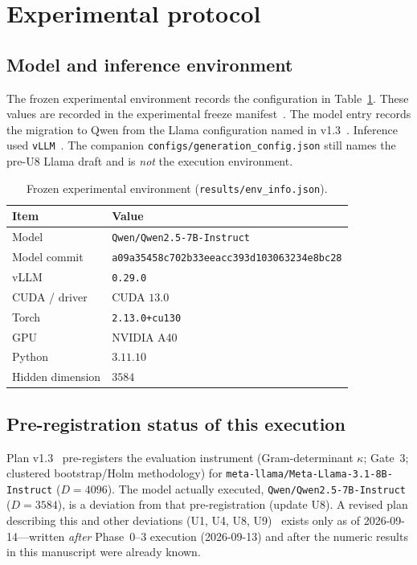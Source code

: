 \documentclass{article}
\begin{document}
\section{Experimental protocol}
\label{sec:protocol}

\subsection{Model and inference environment}
\label{sec:env}

The frozen experimental environment records the configuration in Table~\ref{tab:env}. These values are recorded in the experimental freeze manifest~\citep{exptrj001freeze}. The model entry records the migration to {Qwen} from the {Llama} configuration named in v1.3~\citep{exptrj001planv13}. Inference used \texttt{vLLM}~\citep{kwon2023vllm}. The companion \texttt{configs/generation\_config.json} still names the pre-U8 {Llama} draft and is \emph{not} the execution environment.

\begin{table}[t]
\centering
\caption{Frozen experimental environment (\texttt{results/env\_info.json}).}
\label{tab:env}
\small
\begin{tabular}{@{}ll@{}}
\toprule
Item & Value \\
\midrule
Model & \texttt{Qwen/Qwen2.5-7B-Instruct} \\
Model commit & \texttt{a09a35458c702b33eeacc393d103063234e8bc28} \\
vLLM & \texttt{0.29.0} \\
{CUDA} / driver & {CUDA} $13.0$ \\
Torch & \texttt{2.13.0+cu130} \\
{GPU} & {NVIDIA A40} \\
Python & $3.11.10$ \\
Hidden dimension & $3584$ \\
\bottomrule
\end{tabular}
\end{table}

\subsection{Pre-registration status of this execution}
\label{sec:prereg-status}

Plan v1.3~\citep{exptrj001planv13} pre-registers the evaluation instrument (Gram-determinant $\kappa$; Gate~3; clustered bootstrap/{Holm} methodology) for \texttt{meta-llama/Meta-Llama-3.1-8B-Instruct} ($D=4096$). The model actually executed, \texttt{Qwen/Qwen2.5-7B-Instruct} ($D=3584$), is a deviation from that pre-registration (update {U8}). A revised plan describing this and other deviations ({U1}, {U4}, {U8}, {U9})~\citep{exptrj001plan} exists only as of 2026-09-14---written \emph{after} Phase~0--3 execution (2026-09-13) and after the numeric results in this manuscript were already known.
\end{document}
